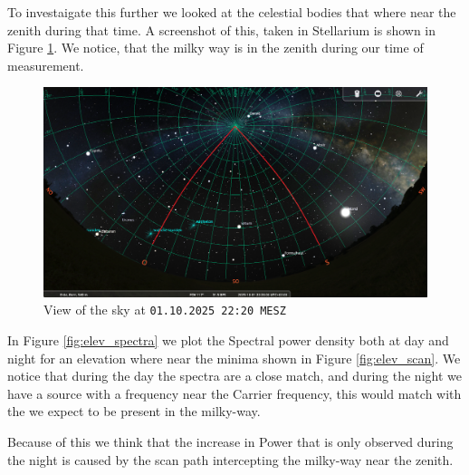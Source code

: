 To investaigate this further we looked at the celestial bodies that where near the zenith during that time. A screenshot of this, taken in Stellarium is shown in Figure \ref{fig:stellarium}. We notice, that the milky way is in the zenith during our time of measurement.

\begin{figure}[ht]
    \centering
    \includegraphics[width=0.5\linewidth]{assets/ElevationScan_Az90_Az180_251001_2220MESZ.png}
    \caption{View of the sky at \texttt{01.10.2025 22:20 MESZ}}
    \label{fig:stellarium}
\end{figure}

In Figure \ref{fig:elev_spectra} we plot the Spectral power density both at day and night for an elevation where near the minima shown in Figure \ref{fig:elev_scan}. We notice that during the day the spectra are a close match, and during the night we have a source with a frequency near the Carrier frequency, this would match with the  we expect to be present in the milky-way.

Because of this we think that the increase in Power that is only observed during the night is caused by the scan path intercepting the milky-way near the zenith.

